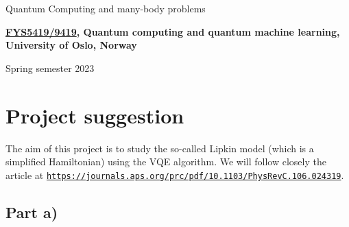 \documentclass[%
oneside,                 %
final,                   %
10pt]{article}
\begin{document}

\newcommand{\exercisesection}[1]{\subsection*{#1}}






\thispagestyle{empty}

\begin{center}
{\LARGE\bf
\begin{spacing}{1.25}
Quantum Computing and many-body problems
\end{spacing}
}
\end{center}


\begin{center}
{\bf \href{{https://www.uio.no/studier/emner/matnat/fys/FYS5419/index-eng.html}}{FYS5419/9419}, Quantum computing and quantum machine learning, University of Oslo, Norway${}^{}$} \\ [0mm]
\end{center}

\begin{center}
\end{center}
    

\begin{center}
Spring semester 2023
\end{center}

\vspace{1cm}


\section*{Project suggestion}

The aim of this project is to study the so-called Lipkin model (which is a simplified Hamiltonian) using the VQE algorithm.
We will follow closely the article at \href{{https://journals.aps.org/prc/pdf/10.1103/PhysRevC.106.024319}}{\nolinkurl{https://journals.aps.org/prc/pdf/10.1103/PhysRevC.106.024319}}. 

\subsection*{Part a)}
\end{document}
